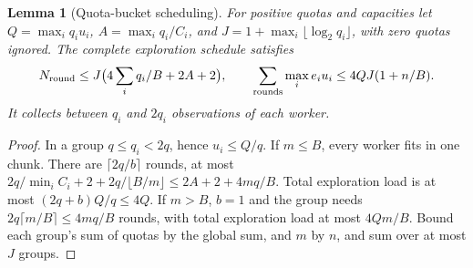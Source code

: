\documentclass[11pt]{article}
\newtheorem{lemma}{Lemma}
\begin{document}
\begin{lemma}[Quota-bucket scheduling]
For positive quotas and capacities let
$Q=\max_i q_i u_i$, $A=\max_i q_i/C_i$, and
$J=1+\max_i\lfloor\log_2 q_i\rfloor$, with zero quotas ignored.
The complete exploration schedule satisfies
\[
 N_{\rm round}\le J\bigl(4\sum_iq_i/B+2A+2\bigr),\qquad
 \sum_{\rm rounds}\max_i e_i u_i\le4QJ(1+n/B).
\]
It collects between $q_i$ and $2q_i$ observations of each worker.
\end{lemma}
\begin{proof}
In a group $q\le q_i<2q$, hence $u_i\le Q/q$.
If $m\le B$, every worker fits in one chunk. There are $\lceil2q/b\rceil$ rounds,
at most $2q/\min_iC_i+2+2q/\lfloor B/m\rfloor
\le2A+2+4mq/B$. Total exploration load is at most
$(2q+b)Q/q\le4Q$.
If $m>B$, $b=1$ and the group needs $2q\lceil m/B\rceil\le4mq/B$ rounds, with
total exploration load at most $4Qm/B$. Bound each group's sum of quotas by
the global sum, and $m$ by $n$, and sum over at most $J$ groups.
\end{proof}
\end{document}
